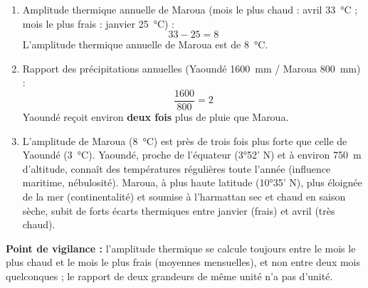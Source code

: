 \documentclass[11pt]{article}
\newcounter{popsec}
\newcounter{popsub}
\newcommand{\courssub}[1]{%
  \stepcounter{popsub}%
  \par\vspace{9pt}\noindent{\popxbold\fontsize{11.5}{13}\selectfont\color{popink}{\color{poporange}\thepopsec.\thepopsub}\hspace{6pt}#1}\par\nopagebreak\vspace{4pt}
}
\begin{document}
\begin{corrige}
\begin{enumerate}
\item Amplitude thermique annuelle de Maroua (mois le plus chaud : avril \SI{33}{\celsius} ; mois le plus frais : janvier \SI{25}{\celsius}) :
\[ 33 - 25 = 8 \]
L'amplitude thermique annuelle de Maroua est de \SI{8}{\celsius}.
\item Rapport des précipitations annuelles (Yaoundé \SI{1600}{mm} / Maroua \SI{800}{mm}) :
\[ \frac{1600}{800} = 2 \]
Yaoundé reçoit environ \textbf{deux fois} plus de pluie que Maroua.
\item L'amplitude de Maroua (\SI{8}{\celsius}) est près de trois fois plus forte que celle de Yaoundé (\SI{3}{\celsius}). Yaoundé, proche de l'équateur (3°52' N) et à environ \SI{750}{m} d'altitude, connaît des températures régulières toute l'année (influence maritime, nébulosité). Maroua, à plus haute latitude (10°35' N), plus éloignée de la mer (continentalité) et soumise à l'harmattan sec et chaud en saison sèche, subit de forts écarts thermiques entre janvier (frais) et avril (très chaud).
\end{enumerate}
\textbf{Point de vigilance :} l'amplitude thermique se calcule toujours entre le mois le plus chaud et le mois le plus frais (moyennes mensuelles), et non entre deux mois quelconques ; le rapport de deux grandeurs de même unité n'a pas d'unité.
\end{corrige}

\courssub{Je m'entraîne}
\end{document}
